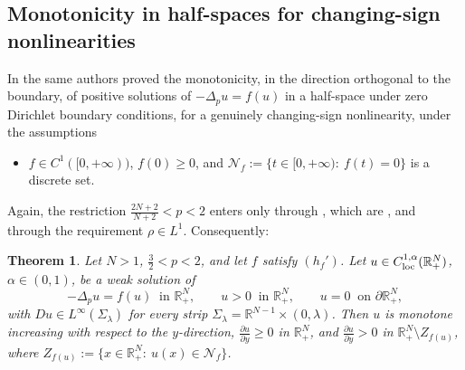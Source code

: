 \documentclass[reqno]{amsart}
\theoremstyle{plain}
\newtheorem{theorem}{Theorem}
\theoremstyle{definition}
\theoremstyle{remark}
\newcommand{\R}{\mathbb{R}}
\begin{document}
\subsection{Monotonicity in half-spaces for changing-sign nonlinearities}
In \cite{EFMS2} the same authors proved the monotonicity, in the direction orthogonal to the
boundary, of positive solutions of $-\Delta_pu=f(u)$ in a half-space under zero Dirichlet boundary
conditions, for a genuinely changing-sign nonlinearity, under the assumptions
\begin{itemize}[leftmargin=2.6em]
\item[$(h_f')$] $f\in C^1([0,+\infty))$, $f(0)\ge0$, and
$\mathcal N_f:=\{t\in[0,+\infty):\ f(t)=0\}$ is a discrete set.
\end{itemize}
Again, the restriction $\frac{2N+2}{N+2}<p<2$ enters only through \cite[Theorems 2.2 and
2.3]{EFMS2}, which are \cite[Theorems 1.4 and 1.2]{DS2}, and through the requirement
$\rho\in L^1$. Consequently:

\begin{theorem}\label{thm:halfspace}
Let $N>1$, $\frac32<p<2$, and let $f$ satisfy $(h_f')$. Let
$u\in C^{1,\alpha}_{\rm loc}(\R^N_+)$, $\alpha\in(0,1)$, be a weak solution of
\[
-\Delta_pu=f(u)\ \text{ in }\R^N_+,\qquad u>0\ \text{ in }\R^N_+,\qquad u=0\ \text{ on }\partial\R^N_+,
\]
with $Du\in L^\infty(\Sigma_\lambda)$ for every strip
$\Sigma_\lambda=\R^{N-1}\times(0,\lambda)$. Then $u$ is monotone increasing with respect to the
$y$-direction, $\frac{\partial u}{\partial y}\ge0$ in $\R^N_+$, and
$\frac{\partial u}{\partial y}>0$ in $\R^N_+\setminus Z_{f(u)}$, where
$Z_{f(u)}:=\{x\in\R^N_+:\ u(x)\in\mathcal N_f\}$.
\end{theorem}
\end{document}
